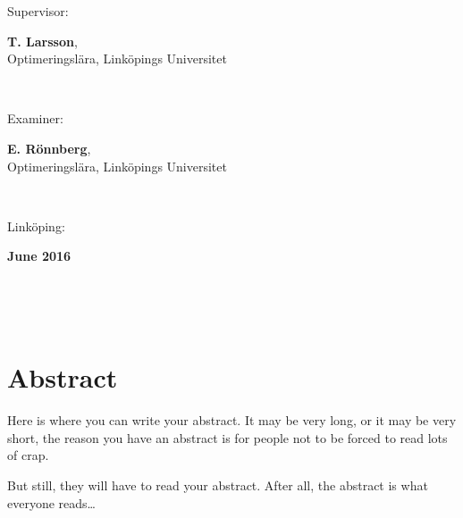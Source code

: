 \documentclass[a4paper, 10pt, twoside, openright]{book}
\newcommand{\putabstract}[0]{%
Here is where you can write your abstract. It may be very long, or it
may be very short, the reason you have an abstract is for people not
to be forced to read lots of crap.

But still, they will have to read your abstract. After all, the
abstract is what everyone reads\ldots}
\newcommand{\putthemonth}[0]{June }
\newcommand{\putshortdate}[0]{2016}
\newcommand{\putmydate}[0]{\putthemonth \putshortdate}
\newcommand{\putexaminer}[0]{E. Rönnberg}
\newcommand{\putsupervisor}[0]{T. Larsson}
\newcommand{\putdepartment}[0]{Optimeringslära}
\newcommand{\putliu}[0]{Linköpings Universitet}
\begin{document}
{\begin{minipage}{150mm}
                Supervisor:\hspace*{3pt}
                \begin{minipage}[t]{120mm}
                  \textbf{\putsupervisor}, \\\putdepartment, \putliu
                \end{minipage} \\ \vspace*{4mm}
                
                Examiner:\hspace*{3pt}
                \begin{minipage}[t]{120mm}
                  \textbf{\putexaminer}, \\\putdepartment, \putliu
                \end{minipage} \\ \vspace*{4mm}
                
                Linköping:
                \begin{minipage}[t]{70mm}
                  \textbf{\putmydate}
                \end{minipage} \\ \vspace*{4mm}
              \end{minipage} \\ \hfill
}

\maketitle

\phantom{crap}
\thispagestyle{empty}
\pagestyle{empty}

\setlength{\unitlength}{1mm}


\setlength{\unitlength}{1pt}

\pagestyle{fancy}

\chapter*{Abstract}
\putabstract
\end{document}

